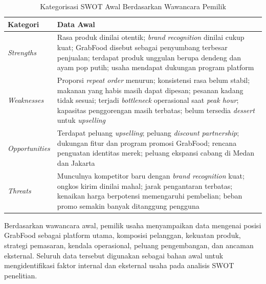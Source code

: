 \begin{table}[h!]
    \centering
    \caption{Kategorisasi SWOT Awal Berdasarkan Wawancara Pemilik}
    \label{tab:swot_prasurvey2}
    \begin{tabularx}{\textwidth}{lY}
        \toprule
        \textbf{Kategori}      & \textbf{Data Awal}                                                                                                                                                                                                                                                                                           \\
        \midrule
        \textit{Strengths}     & Rasa produk dinilai otentik; \textit{brand recognition} dinilai cukup kuat; GrabFood disebut sebagai penyumbang terbesar penjualan; terdapat produk unggulan berupa dendeng dan ayam pop putih; usaha mendapat dukungan program platform                                                                     \\
        \textit{Weaknesses}    & Proporsi \textit{repeat order} menurun; konsistensi rasa belum stabil; makanan yang habis masih dapat dipesan; pesanan kadang tidak sesuai; terjadi \textit{bottleneck} operasional saat \textit{peak hour}; kapasitas penggorengan masih terbatas; belum tersedia \textit{dessert} untuk \textit{upselling} \\
        \textit{Opportunities} & Terdapat peluang \textit{upselling}; peluang \textit{discount partnership}; dukungan fitur dan program promosi GrabFood; rencana penguatan identitas merek; peluang ekspansi cabang di Medan dan Jakarta                                                                                                     \\
        \textit{Threats}       & Munculnya kompetitor baru dengan \textit{brand recognition} kuat; ongkos kirim dinilai mahal; jarak pengantaran terbatas; kenaikan harga berpotensi memengaruhi pembelian; beban promo semakin banyak ditanggung pengguna                                                                                    \\
        \bottomrule
    \end{tabularx}
\end{table}

\FloatBarrier
Berdasarkan wawancara awal, pemilik usaha menyampaikan data mengenai posisi GrabFood sebagai platform utama, komposisi pelanggan, kekuatan produk, strategi pemasaran, kendala operasional, peluang pengembangan, dan ancaman eksternal. Seluruh data tersebut digunakan sebagai bahan awal untuk mengidentifikasi faktor internal dan eksternal usaha pada analisis SWOT penelitian.

